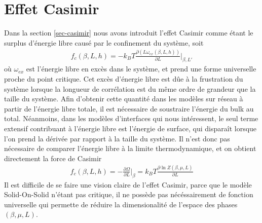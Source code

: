 \section{Effet Casimir}

Dans la section \ref{sec-casimir} nous avons introduit l'effet Casimir comme étant le surplus d'énergie libre causé par le confinement du système, soit 
\begin{align}
    f_c(\beta,L,h) = - k_B T \frac{\partial(L \omega_{ex}(\beta,L,h))}{\partial L}\bigg|_{\beta,L'}
\end{align}
où $\omega_{ex}$ est l'énergie libre en excès dans le système, et prend une forme universelle proche du point critique. Cet excès d'énergie libre est dûe à la frustration du système lorsque la longueur de corrélation est du même ordre de grandeur que la taille du système. Afin d'obtenir cette quantité dans les modèles sur réseau à partir de l'énergie libre totale, il est nécessaire de soustraire l'énergie du bulk au total. Néanmoins, dans les modèles d'interfaces qui nous intéressent, le seul terme extensif contribuant à l'énergie libre est l'énergie de surface, qui disparaît lorsque l'on prend la dérivée par rapport à la taille du système. Il n'est donc pas nécessaire de comparer l'énergie libre à la limite thermodynamique, et on obtient directement la force de Casimir
 \begin{align}
    f_c(\beta,L,h) = - \frac{\partial \Omega}{\partial L}\bigg|_{\beta} = k_B T \frac{\partial \ln Z(\beta,\mu,L)}{\partial L}
    \label{casimir-interface}
\end{align}
Il est difficile de se faire une vision claire de l'effet Casimir, parce que le modèle Solid-On-Solid n'étant pas critique, il ne possède pas nécéssairement de fonction universelle qui permette de réduire la dimensionalité de l'espace des phases $(\beta,\mu,L)$.

